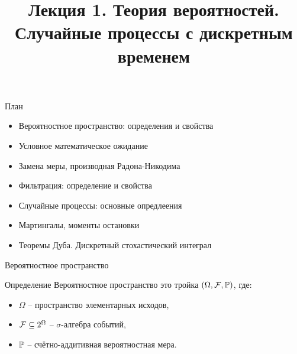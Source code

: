 \documentclass{beamer}
\title[Случайные процессы]{Лекция 1. Теория вероятностей. Случайные процессы с дискретным временем} %
\begin{document}
\begin{frame}
\titlepage 
\end{frame}

\begin{frame}{План}
    \begin{itemize}
        \item Вероятностное пространство: определения и свойства
        \item Условное математическое ожидание
        \item Замена меры, производная Радона-Никодима
        \item Фильтрация: определение и свойства
        \item Случайные процессы: основные опредлеения
        \item Мартингалы, моменты остановки
        \item Теоремы Дуба. Дискретный стохастический интеграл
    \end{itemize}
\end{frame}

\begin{frame}{Вероятностное пространство}

    \begin{block}{Определение}
        Вероятностное пространство это тройка $(\Omega, \mathcal{F}, \mathbb{P})$, где:
        \begin{itemize}
            \item $\Omega$ -- пространство элементарных исходов,
            \item $\mathcal{F} \subseteq 2^{\Omega}$ -- $\sigma$-алгебра событий,
            \item $\mathbb{P}$ -- счётно-аддитивная вероятностная мера.
        \end{itemize}
    \end{block}    
\end{frame}
\end{document}
